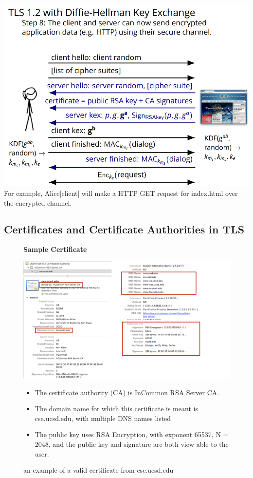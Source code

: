 \documentclass[11pt]{article} %
\begin{document}
\includegraphics[scale=1.2]{./DiffieStep8.png}
\\

For example, Alice[client] will make a HTTP GET request for index.html over 
the encrypted channel.

\newpage
\subsection{Certificates and Certificate Authorities in TLS}

\newpage
\begin{figure}[H]
    \centering
    \textbf{Sample Certificate}\par\medskip
    \includegraphics[scale=.4]{./cert1.png}
    \caption{an example of a valid certificate from cse.ucsd.edu}
    \begin{itemize}
      \item  The certificate authority (CA) is InCommon RSA Server CA.
      \item The domain name for which this certificate is meant is cse.ucsd.edu, with multiple DNS names listed
      \item The public key uses RSA Encryption, with exponent 65537, N = 2048, and the public key and signature are both view able to the user.
    \end{itemize}
\end{figure}
\newpage
\end{document}
